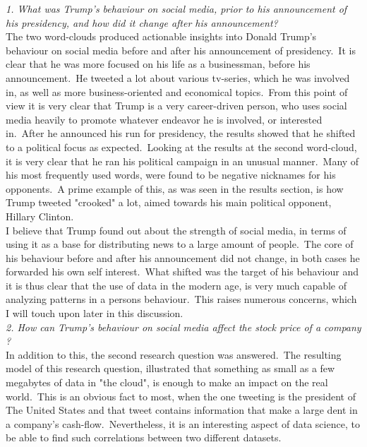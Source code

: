 \documentclass[12pt]{article}
\begin{document}
\textit{1. What was Trump's behaviour on social media, prior to his announcement of his presidency, and how did it change after his announcement?}\\

The two word-clouds produced actionable insights into Donald Trump's behaviour on social media before and after his announcement of presidency.\ It is clear that he was more focused on his life as a businessman, before his announcement.\ He tweeted a lot about  various tv-series, which he was involved in, as well as more business-oriented and economical topics.\ From this point of view it is very clear that Trump is a very career-driven person, who uses social media heavily to promote whatever endeavor he is involved, or interested in.\ After he announced his run for presidency, the results showed that he shifted to a political focus as expected.\ Looking at the results at the second word-cloud, it is very clear that he ran his political campaign in an unusual manner.\ Many of his most frequently used words, were found to be negative nicknames for his opponents.\ A prime example of this, as was seen in the results section, is how Trump tweeted "crooked" a lot, aimed towards his main political opponent, Hillary Clinton. \\ 

I believe that Trump found out about the strength of social media, in terms of using it as a base for distributing news to a large amount of people.\ The core of his behaviour before and after his announcement did not change, in both cases he forwarded his own self interest.\ What shifted was the target of his behaviour and it is thus clear that the use of data in the modern age, is very much capable of analyzing patterns in a persons behaviour.\ This raises numerous concerns, which I will touch upon later in this discussion. \\

\textit{2. How can Trump's behaviour on social media affect the stock price of a company ?} \\

In addition to this, the second research question was answered.\ The resulting model of this research question, illustrated that something as small as a few megabytes of data in "the cloud", is enough to make an impact on the real world.\ This is an obvious fact to most, when the one tweeting is the president of The United States and that tweet contains information that make a large dent in a company's cash-flow.\  Nevertheless, it is an interesting aspect of data science, to be able to find such correlations between two different datasets. \\
\end{document}
